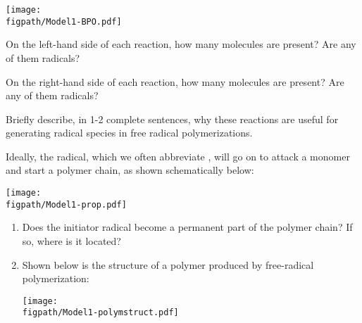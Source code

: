 \begin{activity}
\begin{model}[Initiation]
\begin{enumerate}
			\centerline{\texttt{[image: \\figpath/Model1-BPO.pdf]}}
			
	\end{enumerate}
	
	
\end{model}


\begin{ctqs}

	\question On the left-hand side of each reaction, how many molecules are present?  Are any of them radicals?
	
		\begin{solution}[0.5in]
		\end{solution}
	
	\question On the right-hand side of each reaction, how many molecules are present? Are any of them radicals?
	
		\begin{solution}[0.5in]
		\end{solution}
	
	\question Briefly describe, in 1-2 complete sentences, why these reactions are useful for generating radical species in free radical polymerizations.
	
		\begin{solution}[1.5in]
		\end{solution}
		
	\question Ideally, the radical, which we often abbreviate , will go on to attack a monomer and start a polymer chain, as shown schematically below:
	
			\centerline{\texttt{[image: \\figpath/Model1-prop.pdf]}}
	
		\begin{enumerate}
			\item Does the initiator radical become a permanent part of the polymer chain?  If so, where is it located?
	
				\begin{solution}[1in]
				\end{solution}
			
			 \item Shown below is the structure of a polymer produced by free-radical polymerization:
	
			\centerline{\texttt{[image: \\figpath/Model1-polymstruct.pdf]}}
	

\end{enumerate}
\end{ctqs}
\end{activity}
